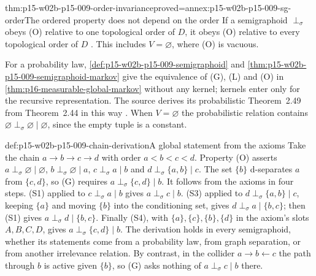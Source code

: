\begin{hbcorollary}{thm:p15-w02b-p15-009-order-invariance}{proved=annex:p15-w02b-p15-009-sg-order}{The ordered property does not depend on the order}
If a semigraphoid \(\perp_\sigma\) obeys (O) relative to one
topological order of \(D\), it obeys (O) relative to every
topological order of \(D\)
\cite[Corollary~2.45, p.~66]{Lauritzen2019GraphicalLectures2020}.
This includes \(V=\varnothing\), where (O) is vacuous.
\end{hbcorollary}

For a probability law, \cref{def:p15-w02b-p15-009-semigraphoid} and
\cref{thm:p15-w02b-p15-009-semigraphoid-markov} give the equivalence of
(G), (L) and (O) in \cref{thm:p16-measurable-global-markov} without any
kernel; kernels enter only for the recursive representation. The source
derives its probabilistic Theorem~2.49 from Theorem~2.44 in this way
\cite[Theorem~2.49, p.~67]{Lauritzen2019GraphicalLectures2020}.
When \(V=\varnothing\) the probabilistic relation contains
\(\varnothing\perp_\sigma\varnothing\mid\varnothing\), since the empty
tuple is a constant.

\begin{hbexample}{def:p15-w02b-p15-009-chain-derivation}{A global statement from the axioms}
Take the chain \(a\to b\to c\to d\) with order \(a<b<c<d\).
Property (O) asserts
\(a\perp_\sigma\varnothing\mid\varnothing\),
\(b\perp_\sigma\varnothing\mid a\),
\(c\perp_\sigma a\mid b\) and
\(d\perp_\sigma\{a,b\}\mid c\).
The set \(\{b\}\) d-separates \(a\) from \(\{c,d\}\), so (G) requires
\(a\perp_\sigma\{c,d\}\mid b\). It follows from the axioms in four steps.
(S1) applied to \(c\perp_\sigma a\mid b\) gives
\(a\perp_\sigma c\mid b\). (S3) applied to
\(d\perp_\sigma\{a,b\}\mid c\), keeping \(\{a\}\) and moving \(\{b\}\)
into the conditioning set, gives \(d\perp_\sigma a\mid\{b,c\}\); then
(S1) gives \(a\perp_\sigma d\mid\{b,c\}\). Finally (S4), with
\(\{a\},\{c\},\{b\},\{d\}\) in the axiom's slots \(A,B,C,D\), gives
\(a\perp_\sigma\{c,d\}\mid b\). The derivation holds in every
semigraphoid, whether its statements come from a probability law, from
graph separation, or from another irrelevance relation. By contrast,
in the collider \(a\to b\leftarrow c\) the path through \(b\) is active
given \(\{b\}\), so (G) asks nothing of \(a\perp_\sigma c\mid b\) there.
\end{hbexample}


